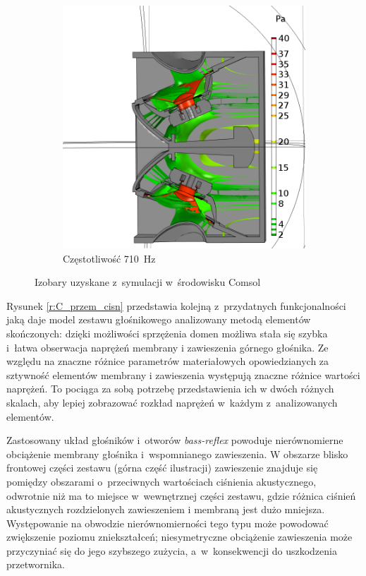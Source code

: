 \documentclass[12pt]{oska}
\begin{document}
\begin{figure}[!ht]
\begin{subfigure}[b]{.49\textwidth}
			\includegraphics[width=\textwidth]{absp_710Hz.png}
			\caption{Częstotliwość \SI{710}{\hertz}}
			\label{r:C_710iz}
		\end{subfigure}
		
		\caption{Izobary uzyskane z~symulacji w~środowisku Comsol}
		\label{r:C_balony}
	\end{figure}
	
	Rysunek \ref{r:C_przem_cisn} przedstawia kolejną z~przydatnych funkcjonalności jaką daje model zestawu głośnikowego analizowany metodą elementów skończonych: dzięki możliwości sprzężenia domen możliwa stała się szybka i~łatwa obserwacja naprężeń membrany i zawieszenia górnego głośnika. Ze względu na znaczne różnice parametrów materiałowych opowiedzianych za sztywność elementów membrany i zawieszenia występują znaczne różnice wartości naprężeń. To pociąga za sobą potrzebę przedstawienia ich w dwóch różnych skalach, aby lepiej zobrazować rozkład naprężeń w~każdym z~analizowanych elementów.
	
	Zastosowany układ głośników i~otworów \textit{bass-reflex} powoduje nierównomierne obciążenie membrany głośnika i~wspomnianego zawieszenia. W obszarze blisko frontowej części zestawu (górna część ilustracji) zawieszenie znajduje się pomiędzy obszarami o~przeciwnych wartościach ciśnienia akustycznego, odwrotnie niż ma to miejsce w~wewnętrznej części zestawu, gdzie różnica ciśnień akustycznych rozdzielonych zawieszeniem i membraną jest dużo mniejsza. Występowanie na obwodzie nierównomierności tego typu może powodować zwiększenie poziomu zniekształceń; niesymetryczne obciążenie zawieszenia może przyczyniać się do jego szybszego zużycia, a~w~konsekwencji do uszkodzenia przetwornika.  
	
\end{document}
